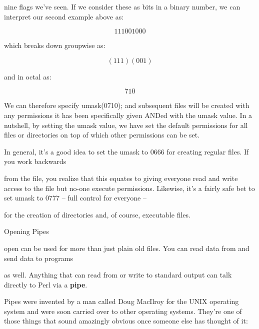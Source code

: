 \documentclass[a4paper,11pt]{book}
\begin{document}
\noindent nine flags we've seen. If we consider these as bits in a binary number, we can interpret our second example above as:

\noindent 

\[111001000\] 


\noindent which breaks down groupwise as:

\noindent 

\noindent 

\begin{equation} \label{GrindEQ__000_} 
(111) (001)  
\end{equation} 


\noindent and in octal as:

\noindent 

\noindent 

\[710\] 


\noindent We can therefore specify umask(0710); and subsequent files will be created with any permissions it has been specifically given ANDed with the umask value. In a nutshell, by setting the umask value, we have set the default permissions for all files or directories on top of which other permissions can be set.

\noindent 

\noindent In general, it's a good idea to set the umask to 0666 for creating regular files. If you work backwards

\noindent from the file, you realize that this equates to giving everyone read and write access to the file but no-one execute permissions. Likewise, it's a fairly safe bet to set umask to 0777 -- full control for everyone --

\noindent for the creation of directories and, of course, executable files.

\noindent 

\noindent 

\noindent Opening Pipes

\noindent 

\noindent open can be used for more than just plain old files. You can read data from and send data to programs

\noindent as well. Anything that can read from or write to standard output can talk directly to Perl via a \textbf{pipe}.

\noindent 

\noindent Pipes were invented by a man called Doug MacIlroy for the UNIX operating system and were soon carried over to other operating systems. They're one of those things that sound amazingly obvious once someone else has thought of it:
\end{document}
